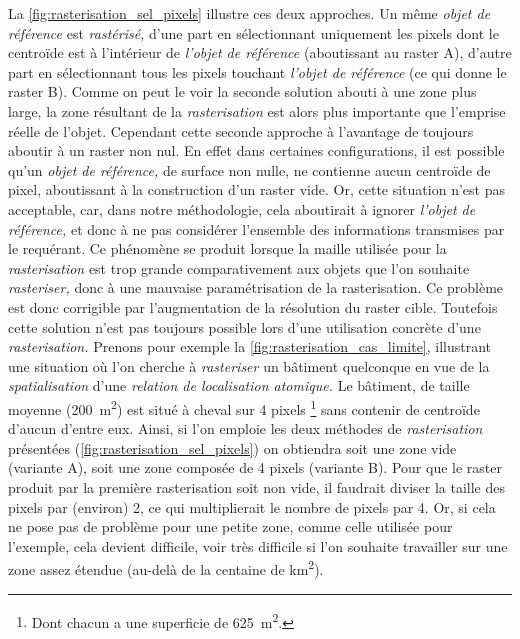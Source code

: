 La \autoref{fig:rasterisation_sel_pixels} illustre ces deux approches. Un même \emph{objet de référence} est \emph{rastérisé,} d'une part en sélectionnant uniquement les pixels dont le centroïde est à l'intérieur de \emph{l'objet de référence} (aboutissant au raster \textcolor{RdBu-9-1}{\textsf{A}}), d'autre part en sélectionnant tous les pixels touchant \emph{l'objet de référence} (ce qui donne le raster \textcolor{RdBu-9-9}{\textsf{B}}). Comme on peut le voir la seconde solution abouti à une zone plus large, la zone résultant de la \emph{rasterisation} est alors plus importante que l'emprise réelle de l'objet. Cependant cette seconde approche à l'avantage de toujours aboutir à un raster non nul. En effet dans certaines configurations, il est possible qu'un \emph{objet de référence,} de surface non nulle, ne contienne aucun centroïde de pixel, aboutissant à la construction d'un raster vide. Or, cette situation n'est pas acceptable, car, dans notre méthodologie, cela aboutirait à ignorer \emph{l'objet de référence,} et donc à ne pas considérer l'ensemble des informations transmises par le requérant. Ce phénomène se produit lorsque la maille utilisée pour la \emph{rasterisation} est trop grande comparativement aux objets que l'on souhaite \emph{rasteriser,} donc à une mauvaise paramétrisation de la rasterisation. Ce problème est donc corrigible par l'augmentation de la résolution du raster cible. Toutefois cette solution n'est pas toujours possible lors d'une utilisation concrète d'une \emph{rasterisation.} Prenons pour exemple la \autoref{fig:rasterisation_cas_limite}, illustrant une situation où l'on cherche à \emph{rasteriser} un bâtiment quelconque en vue de la \emph{spatialisation} d'une \emph{relation de localisation atomique.} Le bâtiment, de taille moyenne (\ie \SI{200}{\metre\squared}) est situé à cheval sur 4 pixels \footnote{Dont chacun a une superficie de \SI{625}{\metre\squared}.} sans contenir de centroïde d'aucun d'entre eux. Ainsi, si l'on emploie les deux méthodes de \emph{rasterisation} présentées (\autoref{fig:rasterisation_sel_pixels}) on obtiendra soit une zone vide (variante \textcolor{RdBu-9-1}{\textsf{A}}), soit une zone composée de 4 pixels (variante \textcolor{RdBu-9-9}{\textsf{B}}). Pour que le raster produit par la première rasterisation soit non vide, il faudrait diviser la taille des pixels par (environ) 2, ce qui multiplierait le nombre de pixels par 4. Or, si cela ne pose pas de problème pour une petite zone, comme celle utilisée pour l'exemple, cela devient difficile, voir très difficile si l'on souhaite travailler sur une zone assez étendue (au-delà de la centaine de \si{\kilo\meter\squared}).

